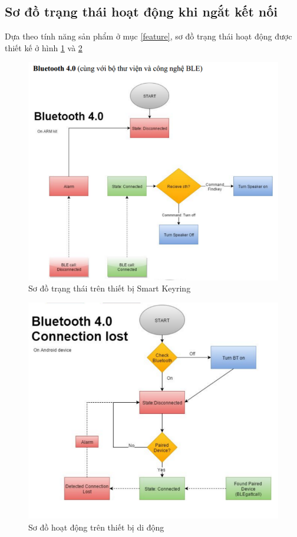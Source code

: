 \subsection{Sơ đồ trạng thái hoạt động khi ngắt kết nối}
Dựa theo tính năng sản phẩm ở mục \ref{feature}, sơ đồ trạng thái hoạt động được thiết kế ở hình \ref{fig: ble} và \ref{fig: blelost}

	\begin{figure}[!ht]
		\centering    
		\includegraphics[width=1.0\textwidth]{ble}
		\caption[Sơ đồ trạng thái trên thiết bị Smart Keyring]{Sơ đồ trạng thái trên thiết bị Smart Keyring}
		\label{fig: ble}
	\end{figure}
	
	\begin{figure}[!ht]
		\centering    
		\includegraphics[width=1.0\textwidth]{blelost}
		\caption[Sơ đồ hoạt động trên thiết bị di động]{Sơ đồ hoạt động trên thiết bị di động}
		\label{fig: blelost}
	\end{figure}

